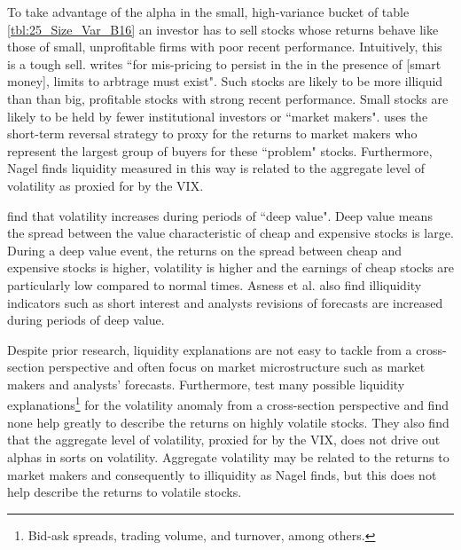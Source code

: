 To take advantage of the alpha in the small, high-variance bucket of table
\ref{tbl:25_Size_Var_B16} an investor has to sell stocks whose returns behave
like those of small, unprofitable firms with poor recent performance.
Intuitively, this is a tough sell.
\textcite{nagel2005short} writes ``for mis-pricing to persist in the in the
presence of [smart money], limits to arbtrage must exist".
Such stocks are likely to be more illiquid than than big, profitable stocks
with strong recent performance.
Small stocks are likely to be held by fewer institutional investors or
``market makers".
\textcite{nagel2012evaporating} uses the short-term reversal strategy to proxy
for the returns to market makers who represent the largest group of buyers for
these ``problem" stocks.
Furthermore, Nagel finds liquidity measured in this way is related to the
aggregate level of volatility as proxied for by the VIX.

\textcite{asness2018deep} find that volatility increases during periods of
``deep value".
Deep value means the spread between the value characteristic of cheap and
expensive stocks is large.
During a deep value event, the returns on the spread between cheap and
expensive stocks is higher, volatility is higher and the earnings of cheap
stocks are particularly low compared to normal times.
Asness et al. also find illiquidity indicators such as short
interest and analysts revisions of forecasts are increased during periods of
deep value.

Despite prior research,
liquidity explanations are not easy to tackle from a cross-section
perspective and often focus on market microstructure such as market makers and
analysts' forecasts.
Furthermore, \textcite{ang2006cross} test many possible liquidity
explanations\footnote{Bid-ask spreads, trading volume, and
turnover, among others.} for the volatility anomaly from a cross-section perspective
and find none help greatly to describe the returns on highly volatile stocks.
They also find that the aggregate level of volatility, proxied for by the VIX,
does not drive out alphas in sorts on volatility.
Aggregate volatility may be related to the returns to market makers and
consequently to illiquidity as Nagel finds,
but this does not help describe the returns to
volatile stocks.


